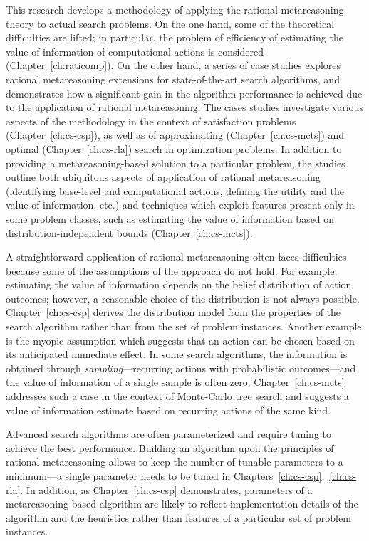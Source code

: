 This research develops a methodology of applying the rational
metareasoning theory to actual search problems.  On the one hand, some
of the theoretical difficulties are lifted; in particular, the problem
of efficiency of estimating the value of information of computational
actions is considered (Chapter~\ref{ch:raticomp}). On the other hand,
a series of case studies explores rational metareasoning extensions
for state-of-the-art search algorithms, and demonstrates how a
significant gain in the algorithm performance is achieved due to the
application of rational metareasoning. The cases studies investigate
various aspects of the methodology in the context of satisfaction
problems (Chapter~\ref{ch:cs-csp}), as well as of approximating
(Chapter~\ref{ch:cs-mcts}) and optimal (Chapter~\ref{ch:cs-rla})
search in optimization problems. In addition to providing a
metareasoning-based solution to a particular problem, the studies
outline both ubiquitous aspects of application of rational metareasoning
(identifying base-level and computational actions, defining the
utility and the value of information, etc.)  and techniques which
exploit features present only in some problem classes, such as
estimating the value of information based on distribution-independent
bounds (Chapter~\ref{ch:cs-mcts}).

A straightforward application of rational metareasoning often faces
difficulties because some of the assumptions of the approach do not
hold. For example, estimating the value of information depends on
the belief distribution of action outcomes; however, a reasonable choice
of the distribution is not always possible. Chapter~\ref{ch:cs-csp}
derives the distribution model from the properties of the search
algorithm rather than from the set of problem instances. Another
example is the myopic assumption \cite{Russell.right} which suggests
that an action can be chosen based on its anticipated immediate
effect. In some search algorithms, the information is obtained through
\emph{sampling}---recurring actions with probabilistic outcomes---and
the value of information of a single sample is often
zero. Chapter~\ref{ch:cs-mcts} addresses such a case in the context
of Monte-Carlo tree search and suggests a value of information
estimate based on recurring actions of the same kind.

Advanced search algorithms are often parameterized and require tuning
to achieve the best performance. Building an algorithm upon the
principles of rational metareasoning allows to keep the number of
tunable parameters to a minimum---a single parameter needs to be tuned
in Chapters~\ref{ch:cs-csp},~\ref{ch:cs-rla}. In addition, as
Chapter~\ref{ch:cs-csp} demonstrates, parameters
of a metareasoning-based algorithm are likely to reflect
implementation details of the algorithm and the heuristics rather
than features of a particular set of problem instances.

